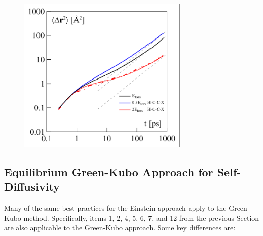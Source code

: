 \documentclass[9pt]{livecoms}
\begin{document}
\begin{figure}[htb!]
	\centering
	\includegraphics[width=3.2in]{figures/KondratyukFig2.png}
	\caption{}
	\label{fig:KondratyukFig2}
\end{figure}

\subsection{Equilibrium Green-Kubo Approach for Self-Diffusivity}

Many of the same best practices for the Einstein approach apply to the Green-Kubo method. Specifically, items 1, 2, 4, 5, 6, 7, and 12 from the previous Section are also applicable to the Green-Kubo approach. Some key differences are:
\end{document}
